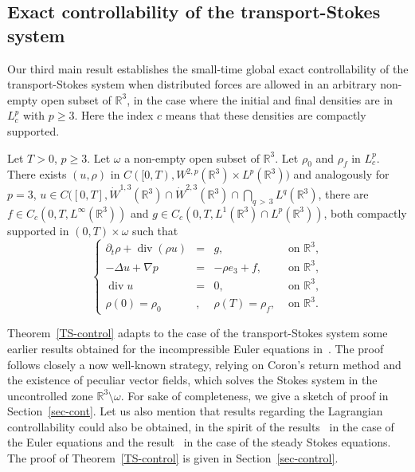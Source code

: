 \documentclass[AHL,Unicode,longabstracts,published]{cedram}
\newcommand{\R}{\mathbb{R}}
\renewcommand{\geq}{\geqslant}
\renewcommand{\div}{\operatorname{div}}
\begin{document}
\subsection{Exact controllability of the transport-Stokes system}

Our third main result establishes the small-time global exact controllability of the transport-Stokes system when distributed forces are allowed in an arbitrary non-empty open subset of $\R^3$, in the case where the initial and final densities are in $L^p_c$ with $p \geq 3$. Here the index $c$ means that these densities are compactly supported.

\begin{theo}\label{TS-control}
Let $T>0$, $p\geq 3$. Let $\omega$ a non-empty open subset of $\R^3$. Let $\rho_0$ and $\rho_f$ in $L^p_c$. There exists $ (u,\rho)$ in $C([0,T),W^{2,p}(\R^3) \times L^p(\R^3))$ and analogously for $p=3$, $u \in C([0,T],\dot{W}^{1,3}(\R^3)\cap \dot{W}^{2,3}(\R^3) \cap \bigcap_{q\,>\,3} L^q(\R^3)$, there are $f \in C_c(0,T, L^\infty(\R^3))$ and $g \in C_c(0,T,L^1(\R^3)\cap L^p(\R^3)) $, both compactly supported in $(0,T)\times \omega $ such that
\begin{equation*}
\left \{
\begin{array}{rcll}
\partial_t \rho +\div(\rho u)&=& g,& \text{ on } \R^3,\\
-\Delta u+\nabla p &=& - \rho e_3+f,& \text{ on } \R^3,\\
\div u&=& 0,& \text{ on } \R^3,\\
\rho(0)=\rho_0&,& \rho(T)=\rho_f,& \text{ on } \R^3.
\end{array}
\right.
\end{equation*}
\end{theo}

Theorem~\ref{TS-control} adapts to the case of the transport-Stokes system some earlier results obtained for the incompressible Euler equations in~\cite{Coron96,G20,G}. The proof follows closely a now well-known strategy, relying on Coron's return method and the existence of peculiar vector fields, which solves the Stokes system in the uncontrolled zone $\R^3 \setminus \omega$. For sake of completeness, we give a sketch of proof in Section~\ref{sec-cont}. Let us also mention that results regarding the Lagrangian controllability could also be obtained, in the spirit of the results~\cite{GH1,GH2,HK} in the case of the Euler equations and the result~\cite{GH3} in the case of the steady Stokes equations. The proof of Theorem~\ref{TS-control} is given in Section~\ref{sec-control}.
\end{document}
